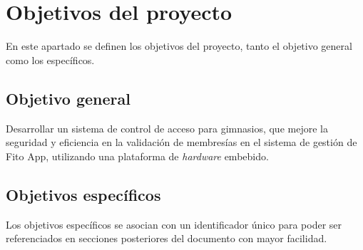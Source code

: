 \section{Objetivos del proyecto}
En este apartado se definen los objetivos del proyecto, tanto el objetivo general como los específicos. 


\subsection{Objetivo general}
Desarrollar un sistema de control de acceso para gimnasios, que mejore la seguridad y eficiencia en la validación de membresías en el sistema de gestión de Fito App, utilizando una plataforma de \textit{hardware} embebido. %


\subsection{Objetivos específicos}\label{secc:objectives}
Los objetivos específicos se asocian con un identificador único para poder ser referenciados en secciones posteriores del documento con mayor facilidad.

